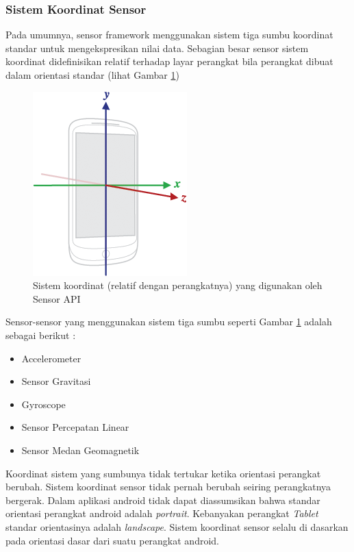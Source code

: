\subsubsection{Sistem Koordinat Sensor}
\label{sssec:sistem_koordinat_sensor}
Pada umumnya, sensor framework menggunakan sistem tiga sumbu koordinat standar untuk mengekspresikan nilai data. Sebagian besar sensor sistem koordinat didefinisikan relatif terhadap layar perangkat bila perangkat dibuat dalam orientasi standar (lihat Gambar \ref{fig:axis-device})
\begin{figure}[htbp]
	\centering
		\includegraphics[scale=1]{Gambar/axis-device.png}
	\caption{Sistem koordinat (relatif dengan perangkatnya) yang digunakan oleh Sensor API}
	\label{fig:axis-device}
\end{figure}
Sensor-sensor yang menggunakan sistem tiga sumbu seperti Gambar \ref{fig:axis-device} adalah sebagai berikut :
\begin{itemize}
	\item Accelerometer
	\item Sensor Gravitasi
	\item Gyroscope
	\item Sensor Percepatan Linear
	\item Sensor Medan Geomagnetik
\end{itemize}
Koordinat sistem yang sumbunya tidak tertukar ketika orientasi perangkat berubah. Sistem koordinat sensor tidak pernah berubah seiring perangkatnya bergerak. Dalam aplikasi android tidak dapat diassumsikan bahwa standar orientasi perangkat android adalah \textit{portrait}. Kebanyakan perangkat \textit{Tablet} standar orientasinya adalah \textit{landscape}. Sistem koordinat sensor selalu di dasarkan pada orientasi dasar dari suatu perangkat android.
